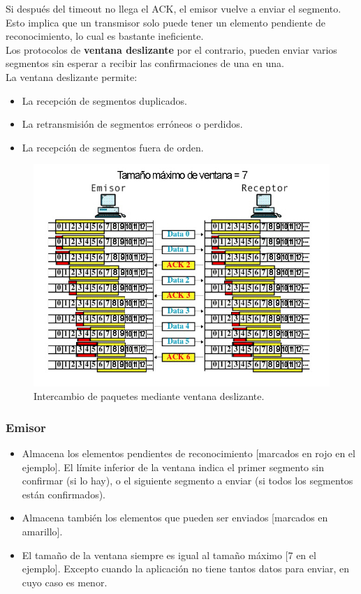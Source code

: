Si después del timeout no llega el ACK, el emisor vuelve a enviar el segmento. Esto implica que un transmisor solo puede tener un elemento pendiente de reconocimiento, lo cual es bastante ineficiente.\\

Los protocolos de \textbf{ventana deslizante} por el contrario, pueden enviar varios segmentos sin esperar a recibir las confirmaciones de una en una.\\

La ventana deslizante permite:
\begin{itemize}
    \item La recepción de segmentos duplicados.
    \item La retransmisión de segmentos erróneos o perdidos.
    \item La recepción de segmentos fuera de orden.
\end{itemize}
\begin{figure}[H]
    \centering
    \includegraphics[width=\textwidth]{img/ventanasTCP.jpg}
    \caption{Intercambio de paquetes mediante ventana deslizante.}
\end{figure}
\subsubsection{Emisor}
\begin{itemize}
    \item Almacena los elementos pendientes de reconocimiento [marcados en rojo en el ejemplo]. El límite inferior de la ventana indica el primer segmento sin confirmar (si lo hay), o el siguiente segmento a enviar (si todos los segmentos están confirmados).
    \item Almacena también los elementos que pueden ser enviados [marcados en amarillo].
    \item El tamaño de la ventana siempre es igual al tamaño máximo [7 en el ejemplo]. Excepto cuando la aplicación no tiene tantos datos para enviar, en cuyo caso es menor.
\end{itemize}
\vspace{2cm}
